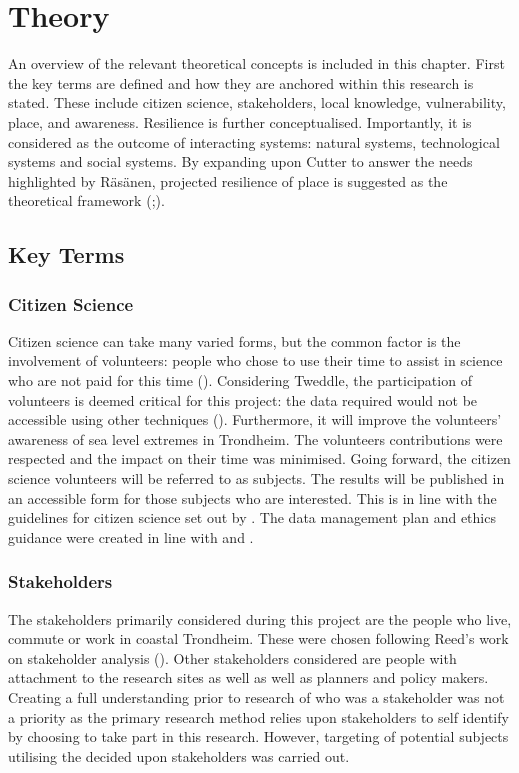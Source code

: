 
\chapter{Theory}


An overview of the relevant theoretical concepts is included in this chapter. First the key terms are defined and how they are anchored within this research is stated. These include citizen science, stakeholders, local knowledge, vulnerability, place, and awareness. Resilience is further conceptualised. Importantly, it is considered as the outcome of interacting systems: natural systems, technological systems and social systems. By expanding upon Cutter to answer the needs highlighted by Räsänen, projected resilience of place is suggested as the theoretical framework (\cite{cutter_place-based_2008};\cite{rasanen_conceptualizing_2020}).

\section{Key Terms}


\subsection{Citizen Science}
Citizen science can take many varied forms, but the common factor is the involvement of volunteers: people who chose to use their time to assist in science who are not paid for this time (\cite{pocock_choosing_2014}). Considering Tweddle, the participation of volunteers is deemed critical for this project: the data required would not be accessible using other techniques (\cite{tweddle_guide_2012}). Furthermore, it will improve the volunteers' awareness of sea level extremes in Trondheim.  The volunteers contributions were respected and the impact on their time was minimised. Going forward, the citizen science volunteers will be referred to as subjects. The results will be published in an accessible form for those subjects who are interested. This is in line with the guidelines for citizen science set out by \cite{tweddle_guide_2012}. The data management plan and ethics guidance were created in line with \cite{nesh_guidelines_2022} and \cite{nsd_norsk_nodate}. 

\subsection{Stakeholders}
The stakeholders primarily considered during this project are the people who live, commute or work in coastal Trondheim. These were chosen following Reed's work on stakeholder analysis (\cite{reed_stakeholder_nodate}). Other stakeholders considered are people with attachment to the research sites as well as well as planners and policy makers. Creating a full understanding prior to research of who was a stakeholder was not a priority as the primary research method relies upon stakeholders to self identify by choosing to take part in this research. However, targeting of potential subjects utilising the decided upon stakeholders was carried out. 

